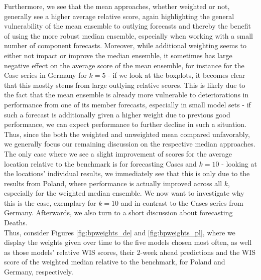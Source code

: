 Furthermore, we see that the mean approaches, whether weighted or not, generally see a higher average relative score, again highlighting the general vulnerability of the mean ensemble to outlying forecasts and thereby the benefit of using the more robust median ensemble, especially when working with a small number of component forecasts. 
Moreover, while additional weighting seems to either not impact or improve the median ensemble, it sometimes has large negative effect on the average score of the mean ensemble, for instance for the Case series in Germany for $k = 5$ - if we look at the boxplots, it becomes clear that this mostly stems from large outlying relative scores. This is likely due to the fact that the mean ensemble is already more vulnerable to deteriorations in performance from one of its member forecasts, especially in small model sets - if such a forecast is additionally given a higher weight due to previous good performance, we can expect performance to further decline in such a situation.\\
Thus, since the both the weighted and unweighted mean compared unfavorably, we generally focus our remaining discussion on the respective median approaches. \medskip\\
The only case where we see a slight improvement of scores for the average location relative to the benchmark is for forecasting Cases and $k = 10$ - looking at the locations' individual results, we immediately see that this is only due to the results from Poland, where performance is actually improved across all $k$, especially for the weighted median ensemble. We now want to investigate why this is the case, exemplary for $k = 10$ and in contrast to the Cases series from Germany. Afterwards, we also turn to a short discussion about forecasting Deaths.\\
Thus, consider Figures \ref{fig:bpweights_de} and \ref{fig:bpweights_pl}, where we display the weights given over time to the five models chosen most often, as well as those models' relative WIS scores, their 2-week ahead predictions and the WIS score of the weighted median relative to the benchmark, for Poland and Germany, respectively.\\
